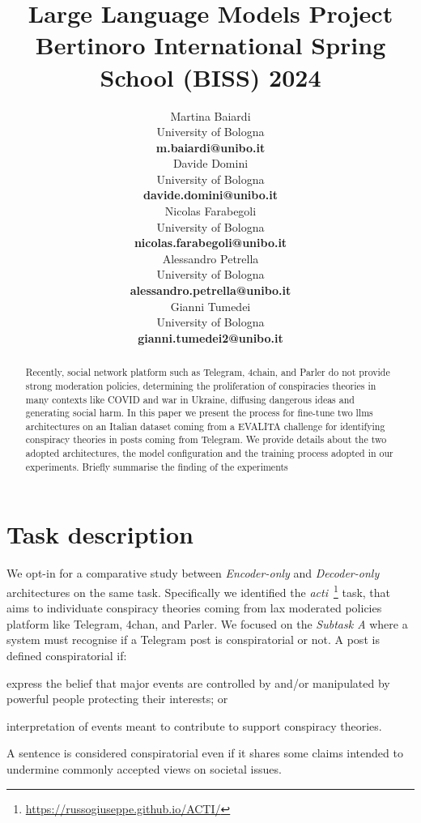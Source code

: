 \documentclass[11pt]{article}
\title{Large Language Models Project \\
Bertinoro International Spring School (BISS) 2024}
\author{
  Martina Baiardi \\
  University of Bologna \\
  {\bf m.baiardi@unibo.it} \\ \And
  Davide Domini \\
  University of Bologna \\
  {\bf davide.domini@unibo.it} \\  \And
  Nicolas Farabegoli \\
  University of Bologna \\
  {\bf nicolas.farabegoli@unibo.it} \\  \AND 
  Alessandro Petrella\\
  University of Bologna \\ 
  {\bf alessandro.petrella@unibo.it} \\ \And 
  Gianni Tumedei \\
  University of Bologna \\
  {\bf gianni.tumedei2@unibo.it}
}
\newcommand{\meta}[1]{{\color{blue}#1}}
\begin{document}
\maketitle

\begin{abstract}
Recently,
social network platform such as Telegram, 4chain, and Parler do not provide strong moderation policies,
determining the proliferation of conspiracies theories in many contexts like COVID and war in Ukraine,
diffusing dangerous ideas and generating social harm.
%
In this paper we present the process for fine-tune two \acp{llm} architectures
on an Italian dataset coming from a EVALITA challenge
for identifying conspiracy theories in posts coming from Telegram.
%
We provide details about the two adopted architectures,
the model configuration and the training process adopted in our experiments.
%
\meta{Briefly summarise the finding of the experiments}
\end{abstract}

\section{Task description}\label{sec:task-description}
We opt-in for a comparative study between \emph{Encoder-only} and \emph{Decoder-only} architectures on the same task.
%
Specifically we identified the \emph{\ac{acti}}~\footnote{\url{https://russogiuseppe.github.io/ACTI/}} task,
that aims to individuate conspiracy theories coming from lax moderated policies platform like Telegram, 4chan, and Parler.
%
We focused on the \emph{Subtask A} where a system must recognise if a Telegram post is conspiratorial or not.
%
A post is defined conspiratorial if:
\begin{enumerate*}[label=(\roman{*})]
  \item express the belief that major events are controlled by and/or manipulated by powerful people protecting their interests; or
  \item interpretation of events meant to contribute to support conspiracy theories.
\end{enumerate*}
A sentence is considered conspiratorial even if it shares some claims intended to undermine commonly accepted views on societal issues.
\end{document}
